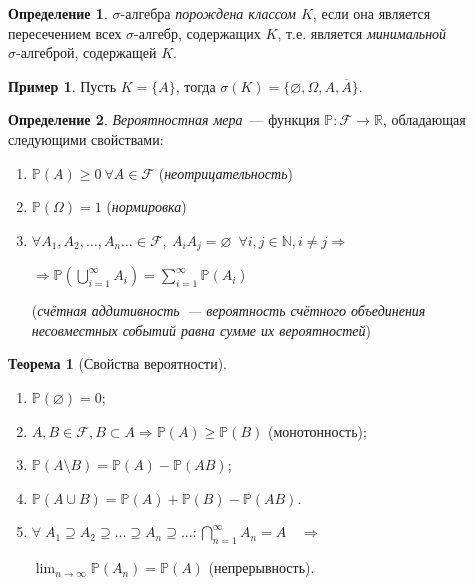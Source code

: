 \documentclass[oneside,final,14pt]{extreport}
\newcommand\myprob[1]{{\mathbb{P}(#1)}}
\theoremstyle{plain}
\theoremstyle{definition}
\newtheorem*{defn}{Определение}
\newtheorem*{exmp}{Пример}
\theoremstyle{named}
\newtheorem*{namedthm}{Теорема}
\begin{document}
\begin{defn}
    $\sigma \text{-алгебра}$ {\it порождена классом $K$}, если она является пересечением всех $\sigma \text{-алгебр}$, содержащих $K$, т.е. является {\it минимальной $\sigma \text{-алгеброй}$}, содержащей $K$.
\end{defn}

\begin{exmp}
    Пусть $K = \{A\}$, тогда $\sigma (K) = \{\varnothing, \Omega, A, \overline{A}\}$.
\end{exmp}

\begin{defn}
    {\it Вероятностная мера}~--- функция $\mathbb{P}: \mathcal{F} \rightarrow \mathbb{R}$, обладающая следующими свойствами:

\begin{enumerate}
    \item $\myprob{A} \geqslant 0~\forall A \in \mathcal{F}$ ({\it неотрицательность})
    \item $\myprob{\Omega} = 1$ ({\it нормировка})
    \item $\forall A_1, A_2, \ldots, A_n\ldots \in \mathcal{F},~ A_{i}A_{j} = \varnothing~ \; \forall i, j \in \mathbb{N}, i \ne j \Rightarrow $
    
    $ \Rightarrow \myprob{\bigcup\limits_{i=1}^\infty A_i} = \sum\limits_{i=1}^\infty \myprob{A_i}$
    
    ({\it счётная аддитивность~--- вероятность счётного объединения несовместных событий равна сумме их вероятностей})
\end{enumerate}
\end{defn}

\begin{namedthm}[Свойства вероятности]\leavevmode
    \begin{enumerate}
       \item $\myprob{\varnothing}=0$;
        \item $A, B \in \mathcal{F}, B \subset A \Rightarrow \myprob{A} \geqslant \myprob{B}$ (монотонность);
       \item $\myprob{A \setminus B} = \myprob{A} - \myprob{AB}$;
       \item $\myprob{A \cup B} = \myprob{A} + \myprob{B} - \myprob{AB}$.
       \item $ \forall \; A_1 \supseteq A_2 \supseteq \ldots \supseteq A_n \supseteq \ldots \colon \bigcap\limits_{n = 1}^{\infty} A_n = A \quad \Rightarrow$
       
       $\displaystyle \lim_{n \to \infty}\myprob{A_n} = \myprob{A}$ (непрерывность).
    \end{enumerate}
\end{namedthm}
\end{document}
